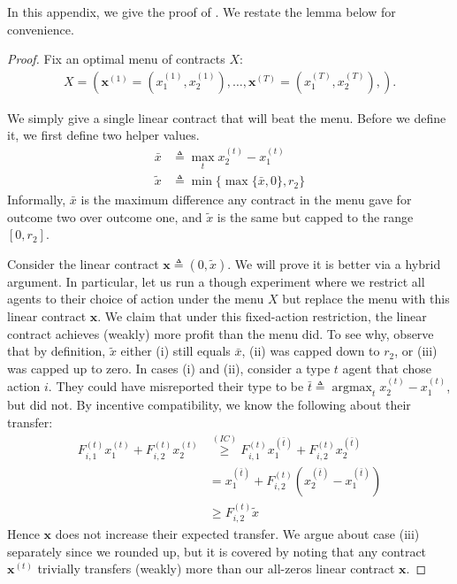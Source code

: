\documentclass{article}
\DeclareMathOperator*{\argmax}{argmax}
\newcommand{\TypedForecast}[3]{F^{(#1)}_{#2, #3}}
\newcommand{\reward}[1]{r_{#1}}
\newcommand{\TypedContract}[2]{x^{(#1)}_{#2}}
\newcommand{\ContractVector}{\bm{x}}
\newcommand{\TypedContractVector}[1]{\bm{x}^{(#1)}}
\newcommand{\ContractMatrix}{X}
\begin{document}
In this appendix, we give the proof of . We restate the lemma below for convenience.

\twooutcomelemma*

\begin{proof}
  Fix an optimal menu of contracts $\ContractMatrix$:
  \begin{align*}
    \ContractMatrix = \left(
      \TypedContractVector{1} = \left(\TypedContract{1}{1}, \TypedContract{1}{2}\right),
      \ldots,
      \TypedContractVector{T} = \left(\TypedContract{T}{1}, \TypedContract{T}{2}\right),
    \right)
    \text{.}
  \end{align*}
  
  We simply give a single linear contract that will beat the menu. Before we define it, we first define two helper values.
  \begin{align*}
    \bar{x} &\triangleq \max_t \TypedContract{t}{2} - \TypedContract{t}{1} \\
    \tilde{x} &\triangleq \min \{ \max \{ \bar{x}, 0 \}, \reward{2} \}
  \end{align*}
  Informally, $\bar{x}$ is the maximum difference any contract in the menu gave for outcome two over outcome one, and $\tilde{x}$ is the same but capped to the range $[0, \reward{2}]$.
  
  Consider the linear contract $\ContractVector \triangleq \left(0, \tilde{x}\right)$. We will prove it is better via a hybrid argument. In particular, let us run a though experiment where we restrict all agents to their choice of action under the menu $\ContractMatrix$ but replace the menu with this linear contract $\ContractVector$. We claim that under this fixed-action restriction, the linear contract achieves (weakly) more profit than the menu did. To see why, observe that by definition, $\tilde{x}$ either (i) still equals $\bar{x}$, (ii) was capped down to $\reward{2}$, or (iii) was capped up to zero. In cases (i) and (ii), consider a type $t$ agent that chose action $i$. They could have misreported their type to be $\bar{t} \triangleq \argmax_t \TypedContract{t}{2} - \TypedContract{t}{1}$, but did not. By incentive compatibility, we know the following about their transfer:
  \begin{align*}
    \TypedForecast{t}{i}{1} \TypedContract{t}{1}
    + \TypedForecast{t}{i}{2} \TypedContract{t}{2}
    &\stackrel{(IC)}{\ge} \TypedForecast{t}{i}{1} \TypedContract{\bar{t}}{1}
    + \TypedForecast{t}{i}{2} \TypedContract{\bar{t}}{2} \\
    &= \TypedContract{\bar{t}}{1}
    + \TypedForecast{t}{i}{2} \left(
      \TypedContract{\bar{t}}{2} - \TypedContract{\bar{t}}{1}
    \right) \\
    &\ge \TypedForecast{t}{i}{2} \tilde{x}
  \end{align*}
  Hence $\ContractVector$ does not increase their expected transfer. We argue about case (iii) separately since we rounded up, but it is covered by noting that any contract $\TypedContractVector{t}$ trivially transfers (weakly) more than our all-zeros linear contract $\ContractVector$.
  

\end{proof}
\end{document}
